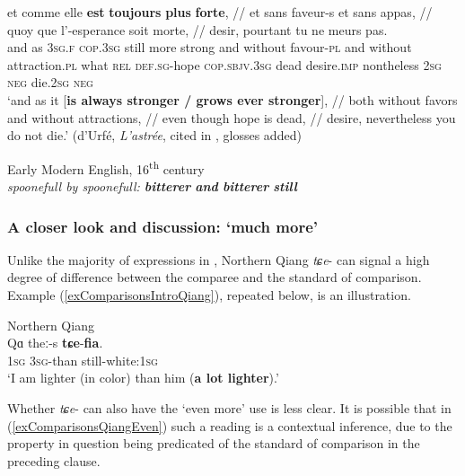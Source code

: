 {\begin{exe}
	\sn\gll et comme elle \textbf{est} \textbf{toujours} \textbf{plus} \textbf{forte}, // et sans faveur-s et sans appas, // quoy que l’-esperance soit morte, // desir, pourtant tu ne meurs pas.\\
	and as 3\textsc{sg}.\textsc{f} \textsc{cop}.3\textsc{sg} still more strong {} and without favour-\textsc{pl} and without attraction.\textsc{pl} {} what \textsc{rel} \textsc{def}.\textsc{sg}-hope \textsc{cop}.\textsc{sbjv}.3\textsc{sg} dead {} desire.\textsc{imp} nontheless 2\textsc{sg} \textsc{neg} die.2\textsc{sg} \textsc{neg}\\
	\glt \lq and as it [\textbf{is always stronger / grows ever stronger}], // both without favors and without attractions, // even though hope is dead, // desire, nevertheless you do not die.\rq{ }(d'Urfé, \textit{L’astrée}, cited in \cite[167]{MosegaardHansen2008}, glosses added)

	\ex Early Modern English, 16\textsuperscript{th} century\label{exComparisonsEME}\\
	\textit{spoonefull by spoonefull: \textbf{bitterer} \textbf{and} \textbf{bitterer} \textbf{still}} \parencite[135]{Lewis2019}
\end{exe}

\subsubsection{A closer look and discussion: \lq much more\rq{}} Unlike the majority of expressions in , Northern Qiang \mbox{\textit{tɕe}-} can signal a high degree of difference between the comparee and the standard of comparison. Example (\ref{exComparisonsIntroQiang}), repeated below, is an illustration.

\begin{exe}
	 Northern Qiang\\
	\gll Qɑ theː-s \textbf{tɕe}-\textbf{fia}.\\
	1\textsc{sg} 3\textsc{sg}-than still-white:1\textsc{sg}\\
	\glt \lq I am lighter (in color) than him (\textbf{a lot lighter}).'
	\\\parencite[88]{LaPollaHuang2003}
\end{exe}

Whether \mbox{\textit{tɕe}-} can also have the \lq even more\rq{ }use is less clear. It is possible that in (\ref{exComparisonsQiangEven}) such a reading is a contextual inference, due to the property in question being predicated of the standard of comparison in the preceding clause.

}

